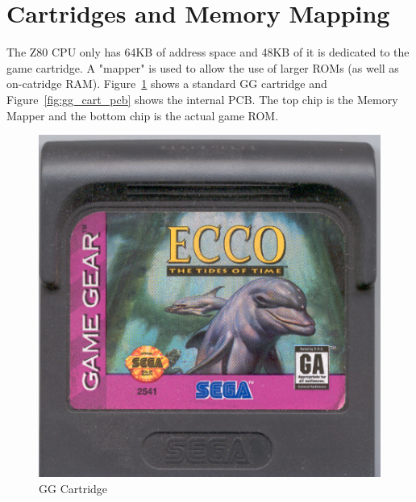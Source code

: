 \documentclass{article}
\begin{document}
\newpage
\section{Cartridges and Memory Mapping}

The Z80 CPU only has 64KB of address space and 48KB of it is
dedicated to the game cartridge. A "mapper" is used to allow the use of
larger ROMs (as well as on-catridge RAM). Figure~\ref{fig:gg_cart}
shows a standard GG cartridge and Figure~\ref{fig:gg_cart_pcb} shows
the internal PCB. The top chip is the Memory Mapper and the bottom chip
is the actual game ROM.

\begin{figure}[H]
    \centering
    \begin{minipage}[H]{0.3\linewidth}
        \centering
        \includegraphics[width=\textwidth]{gg_cart.png}
        \caption{GG Cartridge\protect\cite{gg_cart}}
        \label{fig:gg_cart}
    \end{minipage}
    \hspace{1.5cm}
    \begin{minipage}[H]{0.3\linewidth}
        \centering

\end{minipage}
\end{figure}
\end{document}
